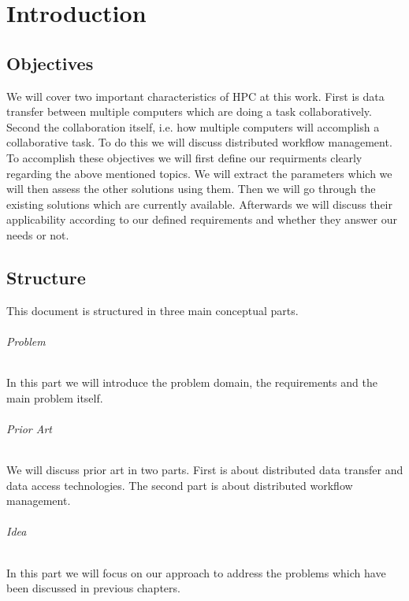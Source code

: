 \chapter{Introduction}
\label{cha:introduction}
\section{Objectives}
We will cover two important characteristics of HPC at this work. First is data transfer between multiple computers which are doing a task collaboratively.
Second the collaboration itself, i.e. how multiple computers will accomplish a collaborative task. To do this we will discuss distributed workflow management.
To accomplish these objectives we will first define our requirments clearly regarding the above mentioned topics. We will extract the parameters which we will
then assess the other solutions using them. Then we will go through the existing solutions 
which are currently available. Afterwards we will discuss their applicability according to our defined requirements and whether they answer our needs or not.

\section{Structure}
This document is structured in three main conceptual parts.
\subparagraph{Problem} In this part we will introduce the problem domain, the 
requirements and the main problem itself.
\subparagraph{Prior Art} We will discuss prior art in two parts. First is about
distributed data transfer and data access technologies. The second part is about
distributed workflow management.
\subparagraph{Idea} In this part we will focus on our approach to address the
problems which have been discussed in previous chapters.